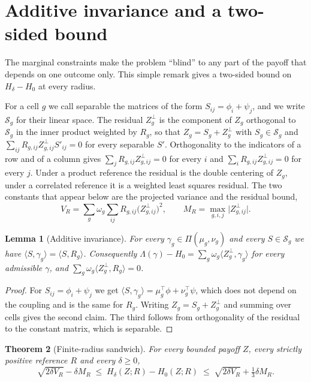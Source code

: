 \documentclass[11pt,a4paper]{article}
\theoremstyle{notesplain}
\newtheorem{theorem}{Theorem}[section]
\newtheorem{lemma}[theorem]{Lemma}
\theoremstyle{notesupright}
\numberwithin{equation}{section}
\begin{document}
\section{Additive invariance and a two-sided bound}
\label{sec:sandwich}
The marginal constraints make the problem ``blind'' to any part of the payoff that depends on one outcome only. This simple remark gives a two-sided bound on $H_\delta-H_0$ at every radius.

For a cell $g$ we call separable the matrices of the form $S_{ij}=\phi_i+\psi_j$, and we write $\mathcal S_g$ for their linear space. The residual $Z^\perp_g$ is the component of $Z_g$ orthogonal to $\mathcal S_g$ in the inner product weighted by $R_g$, so that $Z_g=S_g+Z^\perp_g$ with $S_g\in\mathcal S_g$ and $\sum_{ij}R_{g,ij}Z^\perp_{g,ij}S'_{ij}=0$ for every separable $S'$. Orthogonality to the indicators of a row and of a column gives $\sum_jR_{g,ij}Z^\perp_{g,ij}=0$ for every $i$ and $\sum_iR_{g,ij}Z^\perp_{g,ij}=0$ for every $j$. Under a product reference the residual is the double centering of $Z_g$, under a correlated reference it is a weighted least squares residual. The two constants that appear below are the projected variance and the residual bound,
\begin{equation}
V_R=\sum_g\omega_g\sum_{ij}R_{g,ij}\big(Z^\perp_{g,ij}\big)^2,\qquad M_R=\max_{g,i,j}\big|Z^\perp_{g,ij}\big|.
\label{eq:constants}
\end{equation}

\begin{lemma}[Additive invariance]
\label{lem:additive}
For every $\gamma_g\in\Pi(\mu_g,\nu_g)$ and every $S\in\mathcal S_g$ we have $\langle S,\gamma_g\rangle=\langle S,R_g\rangle$. Consequently $\Lambda(\gamma)-H_0=\sum_g\omega_g\langle Z^\perp_g,\gamma_g\rangle$ for every admissible $\gamma$, and $\sum_g\omega_g\langle Z^\perp_g,R_g\rangle=0$.
\end{lemma}

\begin{proof}
For $S_{ij}=\phi_i+\psi_j$ we get $\langle S,\gamma_g\rangle=\mu_g^\top\phi+\nu_g^\top\psi$, which does not depend on the coupling and is the same for $R_g$. Writing $Z_g=S_g+Z^\perp_g$ and summing over cells gives the second claim. The third follows from orthogonality of the residual to the constant matrix, which is separable.
\end{proof}

\begin{theorem}[Finite-radius sandwich]
\label{thm:sandwich}
For every bounded payoff $Z$, every strictly positive reference $R$ and every $\delta\ge0$,
\begin{equation}
\sqrt{2\delta V_R}-\delta M_R\;\le\;H_\delta(Z;R)-H_0(Z;R)\;\le\;\sqrt{2\delta V_R}+\tfrac13\delta M_R.
\label{eq:sandwich}
\end{equation}
\end{theorem}
\end{document}
